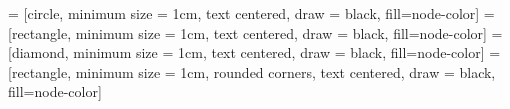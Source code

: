 
 = [circle, minimum size = 1cm, text centered, draw = black, fill={node-color}]
 = [rectangle, minimum size = 1cm, text centered, draw = black, fill={node-color}]
 = [diamond, minimum size = 1cm, text centered, draw = black, fill=node-color]
 = [rectangle, minimum size = 1cm, rounded corners, text centered, draw = black, fill={node-color}]

